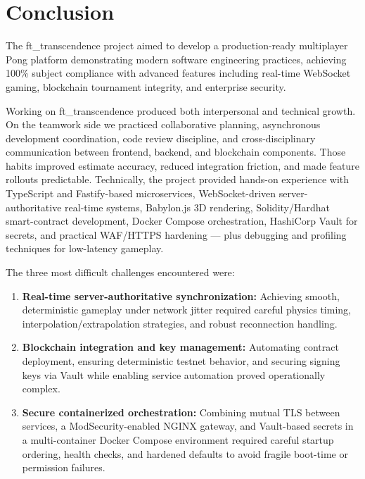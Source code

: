 \documentclass[11pt,a4paper]{report}
\begin{document}
\chapter*{Conclusion}
\label{ch:conclusion}

The ft\_transcendence project aimed to develop a production-ready multiplayer Pong platform demonstrating modern software engineering practices, achieving 100\% subject compliance with advanced features including real-time WebSocket gaming, blockchain tournament integrity, and enterprise security.

Working on ft\_transcendence produced both interpersonal and technical growth. On the teamwork side we practiced collaborative planning, asynchronous development coordination, code review discipline, and cross-disciplinary communication between frontend, backend, and blockchain components. Those habits improved estimate accuracy, reduced integration friction, and made feature rollouts predictable. Technically, the project provided hands-on experience with TypeScript and Fastify-based microservices, WebSocket-driven server-authoritative real-time systems, Babylon.js 3D rendering, Solidity/Hardhat smart-contract development, Docker Compose orchestration, HashiCorp Vault for secrets, and practical WAF/HTTPS hardening — plus debugging and profiling techniques for low-latency gameplay.

The three most difficult challenges encountered were:
\begin{enumerate}
  \item \textbf{Real-time server-authoritative synchronization:} Achieving smooth, deterministic gameplay under network jitter required careful physics timing, interpolation/extrapolation strategies, and robust reconnection handling.
  \item \textbf{Blockchain integration and key management:} Automating contract deployment, ensuring deterministic testnet behavior, and securing signing keys via Vault while enabling service automation proved operationally complex.
  \item \textbf{Secure containerized orchestration:} Combining mutual TLS between services, a ModSecurity-enabled NGINX gateway, and Vault-based secrets in a multi-container Docker Compose environment required careful startup ordering, health checks, and hardened defaults to avoid fragile boot-time or permission failures.
\end{enumerate}
\end{document}
